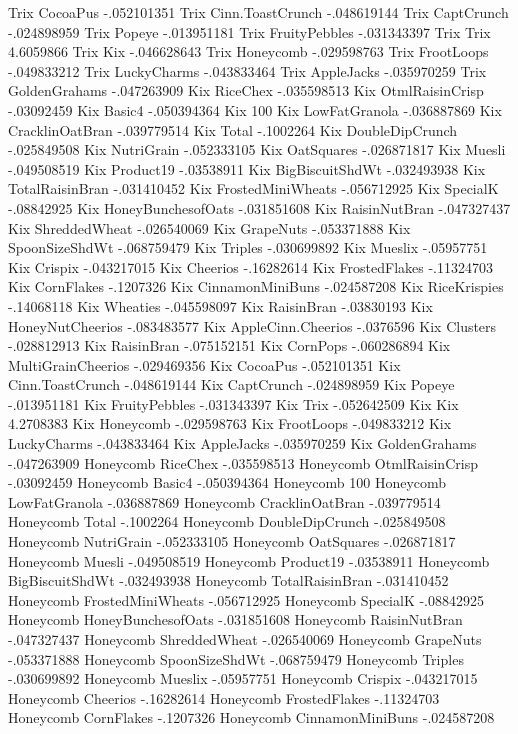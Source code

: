 Trix	CocoaPus	-.052101351
Trix	Cinn.ToastCrunch	-.048619144
Trix	CaptCrunch	-.024898959
Trix	Popeye	-.013951181
Trix	FruityPebbles	-.031343397
Trix	Trix	4.6059866
Trix	Kix	-.046628643
Trix	Honeycomb	-.029598763
Trix	FrootLoops	-.049833212
Trix	LuckyCharms	-.043833464
Trix	AppleJacks	-.035970259
Trix	GoldenGrahams	-.047263909
Kix	RiceChex	-.035598513
Kix	OtmlRaisinCrisp	-.03092459
Kix	Basic4	-.050394364
Kix	100%
Kix	LowFatGranola	-.036887869
Kix	CracklinOatBran	-.039779514
Kix	Total	-.1002264
Kix	DoubleDipCrunch	-.025849508
Kix	NutriGrain	-.052333105
Kix	OatSquares	-.026871817
Kix	Muesli	-.049508519
Kix	Product19	-.03538911
Kix	BigBiscuitShdWt	-.032493938
Kix	TotalRaisinBran	-.031410452
Kix	FrostedMiniWheats	-.056712925
Kix	SpecialK	-.08842925
Kix	HoneyBunchesofOats	-.031851608
Kix	RaisinNutBran	-.047327437
Kix	ShreddedWheat	-.026540069
Kix	GrapeNuts	-.053371888
Kix	SpoonSizeShdWt	-.068759479
Kix	Triples	-.030699892
Kix	Mueslix	-.05957751
Kix	Crispix	-.043217015
Kix	Cheerios	-.16282614
Kix	FrostedFlakes	-.11324703
Kix	CornFlakes	-.1207326
Kix	CinnamonMiniBuns	-.024587208
Kix	RiceKrispies	-.14068118
Kix	Wheaties	-.045598097
Kix	RaisinBran	-.03830193
Kix	HoneyNutCheerios	-.083483577
Kix	AppleCinn.Cheerios	-.0376596
Kix	Clusters	-.028812913
Kix	RaisinBran	-.075152151
Kix	CornPops	-.060286894
Kix	MultiGrainCheerios	-.029469356
Kix	CocoaPus	-.052101351
Kix	Cinn.ToastCrunch	-.048619144
Kix	CaptCrunch	-.024898959
Kix	Popeye	-.013951181
Kix	FruityPebbles	-.031343397
Kix	Trix	-.052642509
Kix	Kix	4.2708383
Kix	Honeycomb	-.029598763
Kix	FrootLoops	-.049833212
Kix	LuckyCharms	-.043833464
Kix	AppleJacks	-.035970259
Kix	GoldenGrahams	-.047263909
Honeycomb	RiceChex	-.035598513
Honeycomb	OtmlRaisinCrisp	-.03092459
Honeycomb	Basic4	-.050394364
Honeycomb	100%
Honeycomb	LowFatGranola	-.036887869
Honeycomb	CracklinOatBran	-.039779514
Honeycomb	Total	-.1002264
Honeycomb	DoubleDipCrunch	-.025849508
Honeycomb	NutriGrain	-.052333105
Honeycomb	OatSquares	-.026871817
Honeycomb	Muesli	-.049508519
Honeycomb	Product19	-.03538911
Honeycomb	BigBiscuitShdWt	-.032493938
Honeycomb	TotalRaisinBran	-.031410452
Honeycomb	FrostedMiniWheats	-.056712925
Honeycomb	SpecialK	-.08842925
Honeycomb	HoneyBunchesofOats	-.031851608
Honeycomb	RaisinNutBran	-.047327437
Honeycomb	ShreddedWheat	-.026540069
Honeycomb	GrapeNuts	-.053371888
Honeycomb	SpoonSizeShdWt	-.068759479
Honeycomb	Triples	-.030699892
Honeycomb	Mueslix	-.05957751
Honeycomb	Crispix	-.043217015
Honeycomb	Cheerios	-.16282614
Honeycomb	FrostedFlakes	-.11324703
Honeycomb	CornFlakes	-.1207326
Honeycomb	CinnamonMiniBuns	-.024587208
